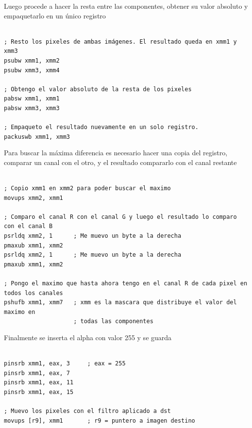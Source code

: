 \documentclass[10pt,a4paper,spanish]{article}
\begin{document}
Luego procede a hacer la resta entre las componentes, obtener su valor absoluto y empaquetarlo en un único registro

\begin{codesnippet}
\begin{verbatim}

; Resto los pixeles de ambas imágenes. El resultado queda en xmm1 y xmm3
psubw xmm1, xmm2
psubw xmm3, xmm4

; Obtengo el valor absoluto de la resta de los pixeles
pabsw xmm1, xmm1
pabsw xmm3, xmm3

; Empaqueto el resultado nuevamente en un solo registro.
packuswb xmm1, xmm3

\end{verbatim}
\end{codesnippet}

Para buscar la máxima diferencia es necesario hacer una copia del registro, comparar un canal con el otro, y el resultado compararlo con el canal restante

\begin{codesnippet}
\begin{verbatim}

; Copio xmm1 en xmm2 para poder buscar el maximo
movups xmm2, xmm1

; Comparo el canal R con el canal G y luego el resultado lo comparo con el canal B
psrldq xmm2, 1		; Me muevo un byte a la derecha
pmaxub xmm1, xmm2
psrldq xmm2, 1		; Me muevo un byte a la derecha
pmaxub xmm1, xmm2

; Pongo el maximo que hasta ahora tengo en el canal R de cada pixel en todos los canales
pshufb xmm1, xmm7   ; xmm es la mascara que distribuye el valor del maximo en 
                    ; todas las componentes

\end{verbatim}
\end{codesnippet}

Finalmente se inserta el alpha con valor 255 y se guarda

\begin{codesnippet}
\begin{verbatim}

pinsrb xmm1, eax, 3     ; eax = 255
pinsrb xmm1, eax, 7
pinsrb xmm1, eax, 11
pinsrb xmm1, eax, 15

; Muevo los pixeles con el filtro aplicado a dst
movups [r9], xmm1       ; r9 = puntero a imagen destino

\end{verbatim}
\end{codesnippet}
\end{document}
